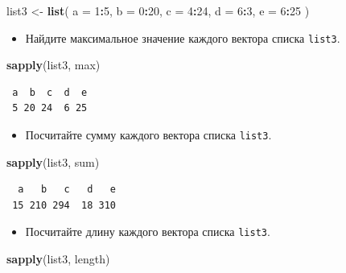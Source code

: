 \documentclass[
]{book}
\newenvironment{Shaded}{\begin{snugshade}}{\end{snugshade}}
\newcommand{\DataTypeTok}[1]{\textcolor[rgb]{0.13,0.29,0.53}{#1}}
\newcommand{\DecValTok}[1]{\textcolor[rgb]{0.00,0.00,0.81}{#1}}
\newcommand{\KeywordTok}[1]{\textcolor[rgb]{0.13,0.29,0.53}{\textbf{#1}}}
\newcommand{\NormalTok}[1]{#1}
\newcommand{\OperatorTok}[1]{\textcolor[rgb]{0.81,0.36,0.00}{\textbf{#1}}}
\newcommand{\StringTok}[1]{\textcolor[rgb]{0.31,0.60,0.02}{#1}}
\providecommand{\tightlist}{%
  \setlength{\itemsep}{0pt}\setlength{\parskip}{0pt}}
\begin{document}
\begin{Shaded}
\begin{Highlighting}[]
\NormalTok{list3 <-}\StringTok{ }\KeywordTok{list}\NormalTok{(}
  \DataTypeTok{a =} \DecValTok{1}\OperatorTok{:}\DecValTok{5}\NormalTok{,}
  \DataTypeTok{b =} \DecValTok{0}\OperatorTok{:}\DecValTok{20}\NormalTok{,}
  \DataTypeTok{c =} \DecValTok{4}\OperatorTok{:}\DecValTok{24}\NormalTok{,}
  \DataTypeTok{d =} \DecValTok{6}\OperatorTok{:}\DecValTok{3}\NormalTok{,}
  \DataTypeTok{e =} \DecValTok{6}\OperatorTok{:}\DecValTok{25}
\NormalTok{  )}
\end{Highlighting}
\end{Shaded}

\begin{itemize}
\tightlist
\item
  Найдите максимальное значение каждого вектора списка \texttt{list3}.
\end{itemize}

\begin{Shaded}
\begin{Highlighting}[]
\KeywordTok{sapply}\NormalTok{(list3, max)}
\end{Highlighting}
\end{Shaded}

\begin{verbatim}
 a  b  c  d  e 
 5 20 24  6 25 
\end{verbatim}

\begin{itemize}
\tightlist
\item
  Посчитайте сумму каждого вектора списка \texttt{list3}.
\end{itemize}

\begin{Shaded}
\begin{Highlighting}[]
\KeywordTok{sapply}\NormalTok{(list3, sum)}
\end{Highlighting}
\end{Shaded}

\begin{verbatim}
  a   b   c   d   e 
 15 210 294  18 310 
\end{verbatim}

\begin{itemize}
\tightlist
\item
  Посчитайте длину каждого вектора списка \texttt{list3}.
\end{itemize}

\begin{Shaded}
\begin{Highlighting}[]
\KeywordTok{sapply}\NormalTok{(list3, length)}
\end{Highlighting}
\end{Shaded}
\end{document}
